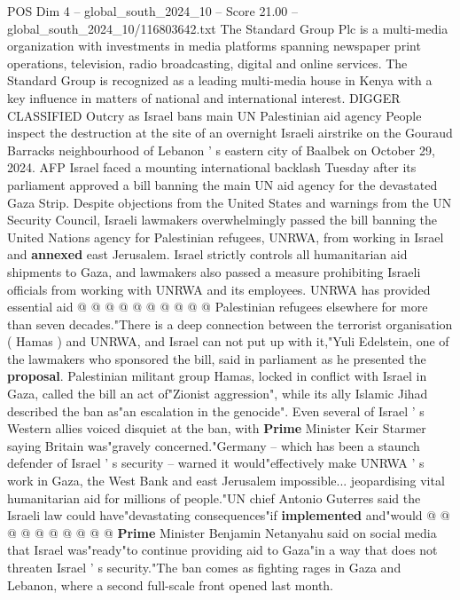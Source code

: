 \begin{textsample}{POS Dim 4 – global\_south\_2024\_10 – Score 21.00 – global\_south\_2024\_10/116803642.txt}  \label{ex:f4_pos_382}
The Standard Group Plc is a multi-media organization with investments in media platforms spanning newspaper print operations, television, radio broadcasting, digital and online services.
The Standard Group is recognized as a leading multi-media house in Kenya with a key influence in matters of national and international interest.
DIGGER CLASSIFIED Outcry as Israel bans main UN Palestinian aid agency People inspect the destruction at the site of an overnight Israeli airstrike on the Gouraud Barracks neighbourhood of Lebanon ' s eastern city of Baalbek on October 29, 2024.
AFP Israel faced a mounting international backlash Tuesday after its parliament approved a bill banning the main UN aid agency for the devastated Gaza Strip.
Despite objections from the United States and warnings from the UN Security Council, Israeli lawmakers overwhelmingly passed the bill banning the United Nations agency for Palestinian refugees, UNRWA, from working in Israel and \textbf{annexed} east Jerusalem.
Israel strictly controls all humanitarian aid shipments to Gaza, and lawmakers also passed a measure prohibiting Israeli officials from working with UNRWA and its employees.
UNRWA has provided essential aid @ @ @ @ @ @ @ @ @ @ Palestinian refugees elsewhere for more than seven decades."There is a deep connection between the terrorist organisation ( Hamas ) and UNRWA, and Israel can not put up with it,"Yuli Edelstein, one of the lawmakers who sponsored the bill, said in parliament as he presented the \textbf{proposal}.
Palestinian militant group Hamas, locked in conflict with Israel in Gaza, called the bill an act of"Zionist aggression", while its ally Islamic Jihad described the ban as"an escalation in the genocide".
Even several of Israel ' s Western allies voiced disquiet at the ban, with \textbf{Prime} Minister Keir Starmer saying Britain was"gravely concerned."Germany -- which has been a staunch defender of Israel ' s security -- warned it would"effectively make UNRWA ' s work in Gaza, the West Bank and east Jerusalem impossible... jeopardising vital humanitarian aid for millions of people."UN chief Antonio Guterres said the Israeli law could have"devastating consequences"if \textbf{implemented} and"would @ @ @ @ @ @ @ @ @ @ \textbf{Prime} Minister Benjamin Netanyahu said on social media that Israel was"ready"to continue providing aid to Gaza"in a way that does not threaten Israel ' s security."The ban comes as fighting rages in Gaza and Lebanon, where a second full-scale front opened last month.

\end{textsample}
